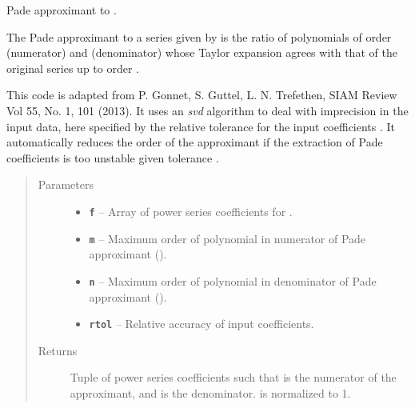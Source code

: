 \documentclass[letterpaper,10pt,english]{sphinxmanual}
\begin{document}
\begin{fulllineitems}
\label{g2tools:g2tools.pade_svd}
\code{{[}m,n{]}} Pade approximant to .

The \code{{[}m,n{]}} Pade approximant to a series given by
 is the ratio of  polynomials of order 
(numerator) and  (denominator) whose  Taylor expansion agrees
with that of the original series up to order .

This code is adapted from P. Gonnet,  S. Guttel, L. N. Trefethen, SIAM
Review Vol 55, No. 1, 101 (2013). It uses an \emph{svd} algorithm to deal with
imprecision in the input data,  here specified by the relative tolerance
 for the  input coefficients . It automatically reduces
the order of the approximant if the extraction of Pade coefficients
is too unstable given tolerance .
\begin{quote}\begin{description}
\item[{Parameters}] \leavevmode\begin{itemize}
\item {} 
\textbf{\texttt{f}} -- Array  of power series coefficients for .

\item {} 
\textbf{\texttt{m}} -- Maximum order of polynomial in numerator of Pade
approximant ().

\item {} 
\textbf{\texttt{n}} -- Maximum order of polynomial in denominator of Pade
approximant ().

\item {} 
\textbf{\texttt{rtol}} -- Relative accuracy of input coefficients.

\end{itemize}

\item[{Returns}] \leavevmode
Tuple of power series coefficients  such that
 is the numerator of the approximant,
and  is the denominator.  is
normalized to 1.

\end{description}\end{quote}

\end{fulllineitems}
\end{document}
